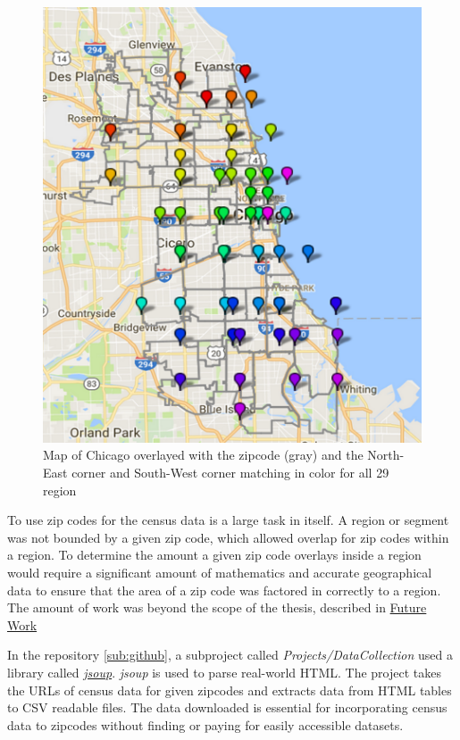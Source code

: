 \documentclass[titlepage,twocolumn]{article}
\begin{document}
\begin{figure}[H]

\centering
\includegraphics[scale=.45]{RegionZipCodeOverLay.png}
\caption{\small Map of Chicago overlayed with the zipcode (gray) and the North-East corner and South-West corner matching in color for all 29 region}
\label{fig:RegionZipCodeMap}
\end{figure}

To use zip codes for the census data is a large task in itself. A region or segment was not bounded by a given zip code, which allowed overlap for zip codes within a region. To determine the amount a given zip code overlays inside a region would require a significant amount of mathematics and accurate geographical data to ensure that the area of a zip code was factored in correctly to a region. The amount of work was beyond the scope of the thesis, described in \hyperref[sec:futureWork]{Future Work}

\par In the repository \ref{sub:github}, a subproject called \textit{Projects/DataCollection} used a library called \emph{\href{https://jsoup.org/}{jsoup}}. \emph{jsoup} is used to parse real-world HTML. The project takes the URLs of census data for given zipcodes and extracts data from HTML tables to CSV readable files. The data downloaded is essential for incorporating census data to zipcodes without finding or paying for easily accessible datasets.  
\end{document}
